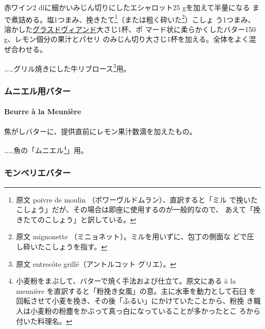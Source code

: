 \begin{recette}
赤ワイン2 dlに細かいみじん切りにしたエシャロット25 gを加えて半量になる
まで煮詰める。塩1つまみ、挽きたて\footnote{原文 poivre de moulin
  （ポワーヴルドムラン）、直訳すると「ミル
  で挽いたこしょう」だが、その場合は即座に使用するのが一般的なので、
  あえて「挽きたてのこしょう」と訳している。}（または粗く砕いた\footnote{原文
  mignonette （ミニョネット）。ミルを用いずに、包丁の側面な
  どで圧し砕いたこしょうを指す。}）こしょ
う1つまみ、溶かした\href{glace-de-viande}{グラスドヴィアンド}大さじ1杯、ポ
マード状に柔らかくしたバター150 g、レモン\unquart{}個分の果汁とパセリ
のみじん切り大さじ1杯を加える。全体をよく混ぜ合わせる。

\ldots{}\ldots{}グリル焼きにした牛リブロース\footnote{原文 entrecôte
  grillé（アントルコット グリエ）。}用。

\maeaki

\hypertarget{ux30e0ux30cbux30a8ux30ebux7528ux30d0ux30bfux30fc}{%
\subsubsection{ムニエル用バター}\label{ux30e0ux30cbux30a8ux30ebux7528ux30d0ux30bfux30fc}}

\hypertarget{beurre-a-la-meuniere}{%
\paragraph{Beurre à la Meunière}\label{beurre-a-la-meuniere}}


焦がしバターに、提供直前にレモン果汁数滴を加えたもの。

\ldots{}\ldots{}魚の「ムニエル\footnote{小麦粉をまぶして、バターで焼く手法および仕立て。原文にある
  à la meunière を直訳すると「粉挽き女風」の意。主に水車を動力として石臼
  を回転させて小麦を挽き、その後「ふるい」にかけていたことから、粉挽
  き職人は小麦粉の粉塵をかぶって真っ白になっていることが多かったとこ
  ろから付いた料理名。}」用。

\maeaki

\hypertarget{ux30e2ux30f3ux30daux30eaux30a8ux30d0ux30bfux30fc}{%
\subsubsection{モンペリエバター}\label{ux30e2ux30f3ux30daux30eaux30a8ux30d0ux30bfux30fc}}


\end{recette}
